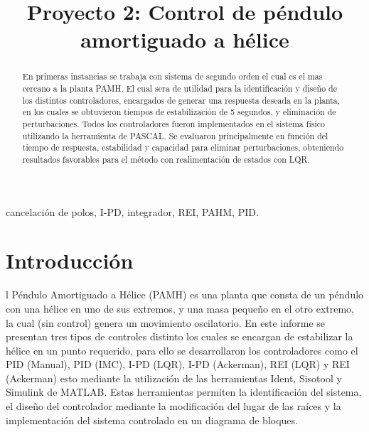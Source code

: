 \documentclass[conference,onecolumn,12pt]{IEEEtran}
\numberwithin{equation}{subsection}
\begin{document}
\title{Proyecto 2: Control de péndulo amortiguado a hélice}

\author{
}


\maketitle
\fontsize{12pt}{12pt}\selectfont
\thispagestyle{plain}
\pagestyle{plain}

\begin{abstract}
\fontsize{12pt}{12pt}\selectfont
En primeras instancias se trabaja con  sistema de segundo orden el cual es el mas cercano a la planta PAMH. El cual sera de utilidad para la identificación y diseño de los distintos controladores, encargados de generar una respuesta deseada en la planta, en los cuales se obtuvieron tiempos de estabilización de 5 segundos, y eliminación de perturbaciones. Todos los controladores fueron implementados en el sistema físico utilizando la herramienta de PASCAL. Se evaluaron principalmente en función del tiempo de respuesta, estabilidad y capacidad para eliminar perturbaciones, obteniendo resultados favorables para el método con realimentación de estados con LQR.

\end{abstract}

\begin{IEEEkeywords}
\fontsize{12pt}{12pt}\selectfont
 cancelación de polos, I-PD, integrador, REI, PAHM, PID.

\end{IEEEkeywords}

\section{Introducción}
\fontsize{12pt}{12pt}\selectfont
{}l Péndulo Amortiguado a Hélice (PAMH) es una planta que consta de un péndulo con una hélice en uno de sus extremos, y una masa pequeño en el otro extremo, la cual (sin control) genera un movimiento oscilatorio. En este informe se presentan tres tipos de controles distinto los cuales se encargan de estabilizar la hélice en un punto requerido, para ello se desarrollaron los controladores como el PID (Manual), PID (IMC), I-PD (LQR), I-PD (Ackerman), REI (LQR) y REI (Ackerman) esto mediante la utilización de las herramientas Ident, Sisotool y Simulink de MATLAB. Estas herramientas permiten la identificación del sistema, el diseño del controlador mediante la modificación del lugar de las raíces y la implementación del sistema controlado en un diagrama de bloques.
\newpage
\end{document}
